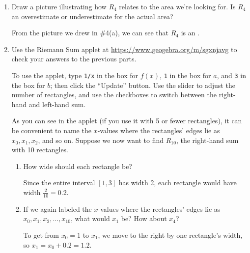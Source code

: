\documentclass{article}
\begin{document}
\begin{enumerate}
\begin{enumerate}
  \item
    \begin{problem}[\vfill]
      Draw a picture illustrating how $R_4$ relates to the area we're
      looking for.  Is $R_4$ an overestimate or underestimate for the
      actual area? 
    \end{problem}

    \begin{solution}
      From the picture we drew in
      {{{{\#4}}(a)}}, we can see that $R_4$ is
      an . 
    \end{solution}

\pspace{\newpage}
    

  \item Use the Riemann Sum applet at \url{https://www.geogebra.org/m/sgxnjavg} to check your answers to the previous
    parts.

    To use the applet, type \texttt{1/x} in the box for $f(x)$,
      \texttt{1} in the box for $a$, and \texttt{3} in the box for $b$;
      then click the ``Update'' button.  Use the slider to adjust the
      number of rectangles, and use the checkboxes to switch between the
      right-hand and left-hand sum.

    As you can see in the applet (if you use it with 5 or fewer
    rectangles), it can be convenient to name the $x$-values where the
    rectangles' edges lie as $x_0, x_1, x_2$, and so on.  Suppose we now
    want to find $R_{10}$, the right-hand sum with 10 rectangles.
    \begin{enumerate}
    \item
      \begin{problem}[\vfill]
        How wide should each rectangle be?
      \end{problem}

      \begin{solution} 
        Since the entire interval $[1, 3]$ has width 2, each rectangle
        would have width $\frac{2}{10} = \boxed{0.2}$.
      \end{solution}

    \item
      \begin{problem}[\vfill]
        If we again labeled the $x$-values where the rectangles' edges lie
        as $x_0, x_1, x_2, \ldots, x_{10}$, what would $x_1$ be?  How
        about $x_4$?
      \end{problem}

      \begin{solution}
        To get from $x_0 = 1$ to $x_1$, we move to the right by one
        rectangle's width, so $x_1 = x_0 + 0.2 = 1.2$.


\end{solution}
\end{enumerate}
\end{enumerate}
\end{enumerate}
\end{document}
